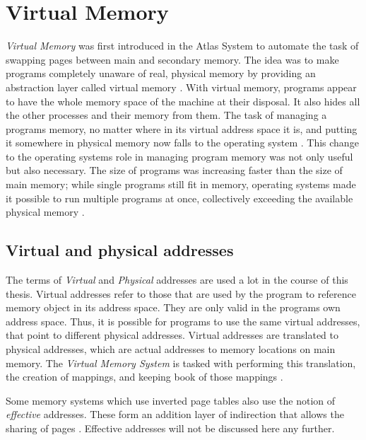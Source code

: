 \section{Virtual Memory}
\textit{Virtual Memory} was first introduced in the Atlas System \cite{fotheringham1961dynamic} to
automate the task of swapping pages between main and secondary memory.
The idea was to make programs completely unaware of real, physical memory by providing
an abstraction layer called virtual memory \cite{denning1996virtual}.
With virtual memory, programs appear to have the whole memory space of the machine at their disposal. It also
hides all the other processes and their memory from them.
The task of managing a programs memory, no matter where in its virtual address space it is, and putting it somewhere
in physical memory now falls to the operating system \cite{denning1970virtual}.
This change to the operating systems role in managing program memory was not only useful but also necessary. The size of programs was increasing faster than the size of main
memory; while single programs
still fit in memory, operating systems made it possible to run multiple programs at once, collectively exceeding
the available physical memory \cite{tanenbaumOS}.

\subsection{Virtual and physical addresses}
The terms of \textit{Virtual} and \textit{Physical} addresses are used a lot in the course of this thesis.
Virtual addresses refer to those that are used by the program to reference memory object in its address
space. They are only valid in the programs own address space. Thus, it is possible for programs to use the same
virtual addresses, that point to different physical addresses.
Virtual addresses are translated to physical addresses, which are actual addresses to memory locations
on main memory. The \textit{Virtual Memory System} is tasked with performing this translation, the creation of mappings,
and keeping book of those mappings \cite{denning1996virtual}.

Some memory systems which use inverted page tables also use the notion of \textit{effective} addresses.
These form an addition layer of indirection that allows the sharing of pages \cite{jacob1998virtualissues}.
Effective addresses will not be discussed here any further.

